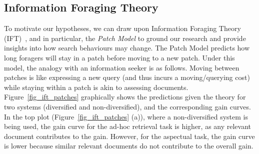 \subsection{Information Foraging Theory} \label{sec:ift}


To motivate our hypotheses, we can draw upon Information Foraging Theory (IFT)~\cite{pirolli1999ift}, and in particular, the \textit{Patch Model} to ground our research and provide insights into how search behaviours may change. %
The Patch Model predicts how long foragers will stay in a patch before moving to a new patch. Under this model, the analogy with an information seeker is as follows. Moving between patches is like expressing a new query (and thus incurs a moving/querying cost) while staying within a patch is akin to assessing documents. 
Figure~\ref{fig_ift_patches} graphically shows the predictions given the theory for two systems (diversified and non-diversified), and the corresponding gain curves. In the top plot (Figure~\ref{fig_ift_patches} (a)), where a non-diversified system is being used, the gain curve for the ad-hoc retrieval task is higher, as any relevant document contributes to the gain. However, for the aspectual task, the gain curve is lower because similar relevant documents do not contribute to the overall gain.

